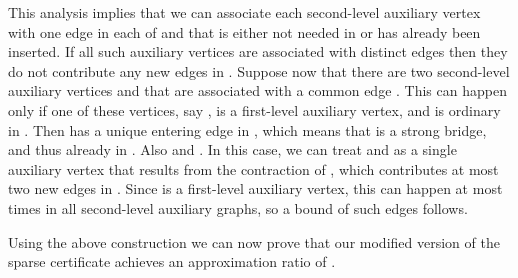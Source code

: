\documentclass[11pt]{article}
\begin{document}
\begin{description}
This analysis implies that we can associate each second-level auxiliary vertex with one edge in each of  and  that is either not needed in  or has already been inserted.
If all such auxiliary vertices are associated with distinct edges then they do not contribute any new edges in .
Suppose now that there are two second-level auxiliary vertices  and  that are associated with a common edge .
This can happen only if one of these vertices, say , is a first-level auxiliary vertex, and  is ordinary in .
Then  has a unique entering edge in , which means that  is a strong bridge, and thus already in .
Also  and .
In this case, we can treat  and  as a single auxiliary vertex that results from the contraction of , which contributes at most two new edges in .
Since  is a first-level auxiliary vertex, this can happen at most  times in all second-level auxiliary graphs, so a bound of  such edges follows.
\end{description}

Using the above construction we can now prove that our modified version of the sparse certificate achieves an approximation ratio of .
\end{document}
